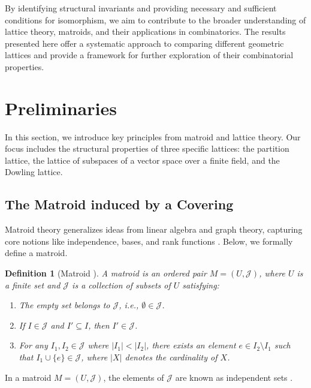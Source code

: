 \documentclass{article}
\newtheorem{definition}[theorem]{Definition}
\begin{document}
By identifying structural invariants and providing necessary and sufficient conditions for isomorphism, we aim to contribute to the broader understanding of lattice theory, matroids, and their applications in combinatorics. The results presented here offer a systematic approach to comparing different geometric lattices and provide a framework for further exploration of their combinatorial properties.

\section{Preliminaries}

In this section, we introduce key principles from matroid and lattice theory. Our focus includes the structural properties of three specific lattices: the partition lattice, the lattice of subspaces of a vector space over a finite field, and the Dowling lattice.

\subsection{The Matroid induced by a Covering}
Matroid theory generalizes ideas from linear algebra and graph theory, capturing core notions like independence, bases, and rank functions \citep{Oxley2006, Welsh1976}. Below, we formally define a matroid.

\begin{definition}[Matroid \citep{Whitney1935}]
A matroid is an ordered pair \( M = (U, \mathcal{J}) \), where \( U \) is a finite set and \( \mathcal{J} \) is a collection of subsets of \( U \) satisfying:
\begin{enumerate}
    \item[\( \mathbf{I1} \)] The empty set belongs to \( \mathcal{J} \), i.e., \( \emptyset \in \mathcal{J} \).
    \item[\( \mathbf{I2} \)] If \( I \in \mathcal{J} \) and \( I' \subseteq I \), then \( I' \in \mathcal{J} \).
    \item[\( \mathbf{I3} \)] For any \( I_1, I_2 \in \mathcal{J} \) where \( |I_1| < |I_2| \), there exists an element \( e \in I_2 \setminus I_1 \) such that \( I_1 \cup \{e\} \in \mathcal{J} \), where \( |X| \) denotes the cardinality of \( X \).
\end{enumerate}
\end{definition}

In a matroid \( M = (U, \mathcal{J}) \), the elements of \( \mathcal{J} \) are known as independent sets \citep{Oxley2006}.
\end{document}
